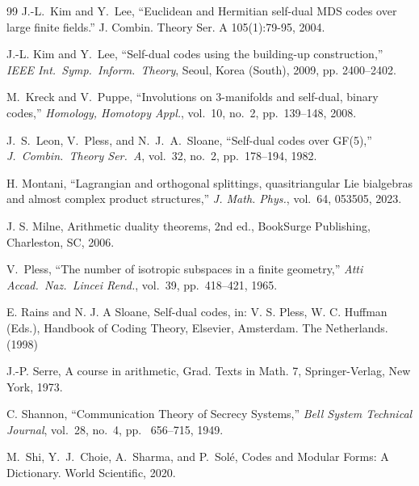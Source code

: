 \documentclass[12pt]{article}
\begin{document}
\begin{thebibliography}{99}
J.-L.~Kim and Y.~Lee, ``Euclidean and Hermitian self-dual MDS codes over large finite fields.'' J. Combin. Theory Ser. A 105(1):79-95, 2004.


J.-L. Kim and Y.~Lee,
``Self-dual codes using the building-up construction,''
\textit{IEEE Int.\ Symp.\ Inform.\ Theory}, Seoul, Korea (South), 2009, pp. 2400--2402.


M.~Kreck and V.~Puppe,
``Involutions on 3-manifolds and self-dual, binary codes,''
\textit{Homology, Homotopy Appl.}, vol.~10, no.~2, pp.~139--148, 2008.

J.~S.~Leon, V.~Pless, and N.~J.~A.~Sloane,
``Self-dual codes over GF(5),''
\textit{J.\ Combin.\ Theory Ser.~A}, vol.~32, no.~2, pp.~178--194, 1982.

H. Montani,
``Lagrangian and orthogonal splittings, quasitriangular Lie bialgebras and almost complex product structures,''
\textit{J. Math. Phys.}, vol.~64, 053505, 2023.

 J. S. Milne, Arithmetic duality theorems, 2nd ed., BookSurge Publishing,
Charleston, SC, 2006.

V.~Pless,
``The number of isotropic subspaces in a finite geometry,''
\textit{Atti Accad.\ Naz.\ Lincei Rend.}, vol.~39, pp.~418--421, 1965.


 E. Rains and N. J. A Sloane, Self-dual codes, in: V. S. Pless, W. C. Huffman (Eds.),
Handbook of Coding Theory, Elsevier, Amsterdam. The Netherlands. (1998)

 J.-P. Serre, A course in arithmetic, Grad. Texts in Math. 7, Springer-Verlag,
New York, 1973.

C. Shannon, ``Communication Theory of Secrecy Systems,'' \textit{Bell System Technical Journal}, vol.~28, no.~4, pp.~ 656--715, 1949.


 M.~Shi, Y.~J.~Choie, A.~Sharma, and P.~Sol\'{e}, Codes and Modular Forms: A Dictionary. World Scientific, 2020.





\end{thebibliography}
\end{document}
